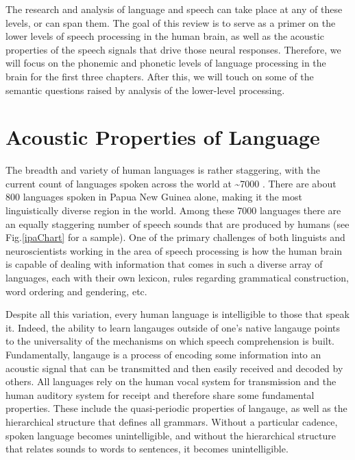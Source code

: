 \documentclass[titlepage]{article}
\begin{document}
  The research and analysis of language and speech can take place at any of these
  levels, or can span them. The goal of this review is to serve as a primer
  on the lower levels of speech processing in the human brain, as well as the
  acoustic properties of the speech signals that drive those neural responses.
  Therefore, we will focus on the phonemic and phonetic levels of language
  processing in the brain for the first three chapters. After this, we will touch on
  some of the semantic questions raised by analysis of the lower-level processing.

\section{Acoustic Properties of Language} \label{acoustics}

  The breadth and variety of human languages is rather staggering, with
  the current count of languages spoken across the world at \textasciitilde 7000 \cite{Simons2017}.
  There are about 800 languages spoken in Papua New Guinea alone, making it the
  most linguistically diverse region in the world. Among these 7000 languages
  there are an equally staggering number of speech sounds that are produced by humans
  (see Fig.\ref{ipaChart} for a sample). One of the primary challenges of both
  linguists and neuroscientists working in the area of speech processing is
  how the human brain is capable of dealing with information that comes in such a diverse
  array of languages, each with their own lexicon, rules regarding grammatical construction,
  word ordering and gendering, etc.

  Despite all this variation, every human language is intelligible to those that speak it.
  Indeed, the ability to learn langauges outside of one's native langauge points to the
  universality of the mechanisms on which speech comprehension is built. Fundamentally,
  langauge is a process of encoding some information into an acoustic signal that can
  be transmitted and then easily received and decoded by others. All languages rely on
  the human vocal system for transmission and the human auditory system for receipt
  and therefore share some fundamental properties. These include the quasi-periodic
  properties of langauge, as well as the hierarchical structure that defines all
  grammars. Without a particular cadence, spoken language becomes unintelligible,
  and without the hierarchical structure that relates sounds to words to sentences,
  it becomes unintelligible.
\end{document}
